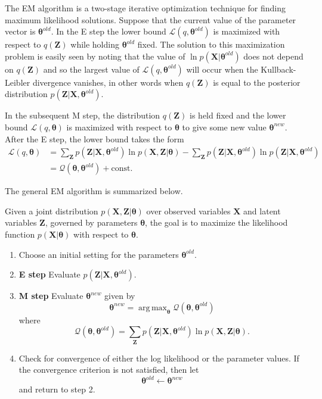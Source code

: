 \documentclass[a4paper]{report}
\newcommand{\up}{\mathrm}
\renewcommand{\bf}{\mathbf}
\renewcommand{\cal}{\mathcal}
\newcommand{\bs}{\boldsymbol}
\DeclareMathOperator*{\argmax}{arg\,max}
\begin{document}
The EM algorithm is a two-stage iterative optimization technique for finding maximum likelihood solutions. Suppose that the current value of the parameter vector is $\bs{\theta}^{old}$. In the E step the lower bound $\cal{L}(q,\bs{\theta}^{old})$ is maximized with respect to $q(\bf{Z})$ while holding $\bs{\theta}^{old}$ fixed. The solution to this maximization problem is easily seen by noting that the value of $\ln p(\bf{X}|\bs{\theta}^{old})$ does not depend on $q(\bf{Z})$ and so the largest value of $\cal{L}(q,\bs{\theta}^{old})$ will occur when the Kullback-Leibler divergence vanishes, in other words when $q(\bf{Z})$ is equal to the posterior distribution $p(\bf{Z|X},\bs{\theta}^{old})$.

In the subsequent M step, the distribution $q(\bf{Z})$ is held fixed and the lower bound $\cal{L}(q,\bs{\theta})$ is maximized with respect to $\bs{\theta}$ to give some new value $\bs{\theta}^{new}$. After the E step, the lower bound takes the form
\begin{align}
	\cal{L}(q,\bs{\theta})  &= \sum_{\bf{Z}} p(\bf{Z|X},\bs{\theta}^{old})\ln p(\bf{X,Z|}\bs{\theta}) - \sum_{\bf{Z}} p(\bf{Z|X,}\bs{\theta}^{old}) \ln p(\bf{Z|X},\bs{\theta}^{old})\\
	&=\cal{Q}(\bs{\theta,\theta}^{old}) + \up{const}.
\end{align}

The general EM algorithm is summarized below.

Given a joint distribution $p(\bf{X,Z|}\bs{\theta})$ over observed variables $\bf{X}$ and latent variables $\bf{Z}$, governed by parameters $\bf{\theta}$, the goal is to maximize the likelihood function $p(\bf{X}|\bs{\theta})$ with respect to $\bs{\theta}$.
\begin{enumerate}
	\item Choose an initial setting for the parameters $\bs{\theta}^{old}$.
	\item \textbf{E step} Evaluate $p(\bf{Z|X},\bs{\theta}^{old})$.
	\item \textbf{M step} Evaluate $\bs{\theta}^{new}$ given by
	\begin{equation*}
		\bs{\theta}^{new} = \argmax_{\bs{\theta}} \cal{Q}(\bs{\theta,\theta}^{old})	
	\end{equation*}
	where 
	\begin{equation*}
		\cal{Q}(\bs{\theta,\theta}^{old})=\sum_{\bf{Z}} p(\bf{Z|X,}\bs{\theta}^{old})\ln p(\bf{X,Z|}\bs{\theta}).
	\end{equation*}
	\item Check for convergence of either the log likelihood or the parameter values. If the convergence criterion is not satisfied, then let
	\begin{equation*}
		\bs{\theta}^{old} \leftarrow \bs{\theta}^{new}
	\end{equation*}
	and return to step 2.
\end{enumerate}
\end{document}

